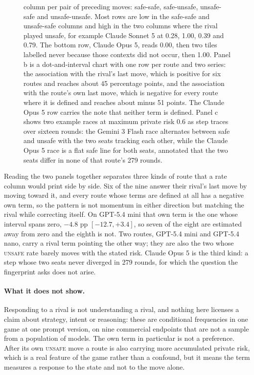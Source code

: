 \documentclass[sigconf,anonymous]{aamas}
\newcommand{\Unsafe}{\textsc{unsafe}}
\begin{document}
\begin{figure}[t]
{    column per pair of preceding moves: safe-safe, safe-unsafe, unsafe-safe and
    unsafe-unsafe. Most rows are low in the safe-safe and unsafe-safe columns
    and high in the two columns where the rival played unsafe, for example
    Claude Sonnet 5 at 0.28, 1.00, 0.39 and 0.79. The bottom row, Claude Opus
    5, reads 0.00, then two tiles labelled never because those contexts did not
    occur, then 1.00. Panel b is a dot-and-interval chart with one row per
    route and two series: the association with the rival's last move, which is
    positive for six routes and reaches about 45 percentage points, and the
    association with the route's own last move, which is negative for every route
    where it is defined and reaches about minus 51 points. The Claude Opus 5
    row carries the note that neither term is defined. Panel c shows two
    example races at maximum private risk 0.6 as step traces over sixteen
    rounds: the Gemini 3 Flash race alternates between safe and unsafe with the
    two seats tracking each other, while the Claude Opus 5 race is a flat safe
    line for both seats, annotated that the two seats differ in none of that
    route's 279 rounds.}
    \label{fig:policy-shape}
\end{figure}

Reading the two panels together separates three kinds of route that a rate
column would print side by side. Six of the nine answer their rival's last move
by moving toward it, and every route whose terms are defined at all has a
negative own term, so the pattern is not momentum in either direction but
matching the rival while correcting itself. On GPT-5.4 mini that own term is
the one whose interval spans zero, $-4.8$ pp $[-12.7,+3.4]$, so seven of the
eight are estimated away from zero and the eighth is not. Two routes, GPT-5.4 mini and
GPT-5.4 nano, carry a rival term pointing the other way; they are also the two
whose \Unsafe{} rate barely moves with the stated risk. Claude Opus 5 is the
third kind: a step whose two seats never diverged in 279 rounds, for
which the question the fingerprint asks does not arise.

\paragraph{What it does not show.} Responding to a rival is not understanding a
rival, and nothing here licenses a claim about strategy, intent or reasoning:
these are conditional frequencies in one game at one prompt version, on nine
commercial endpoints that are not a sample from a population of models. The own
term in particular is not a preference. After its own \Unsafe{} move a route is
also carrying more accumulated private risk, which is a real feature of the game
rather than a confound, but it means the term measures a response to the state
and not to the move alone.
\end{document}
